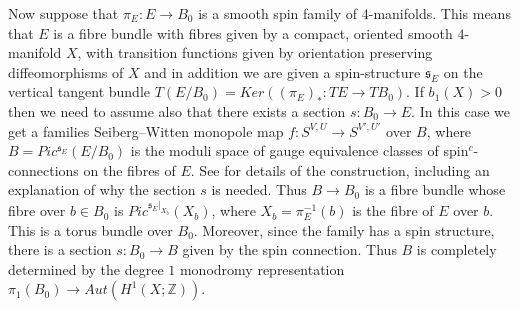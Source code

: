 \documentclass{amsart}
\theoremstyle{definition}
\theoremstyle{remark}
\numberwithin{equation}{section}
\begin{document}
Now suppose that $\pi_E : E \to B_0$ is a smooth spin family of $4$-manifolds. This means that $E$ is a fibre bundle with fibres given by a compact, oriented smooth $4$-manifold $X$, with transition functions given by orientation preserving diffeomorphisms of $X$ and in addition we are given a spin-structure $\mathfrak{s}_E$ on the vertical tangent bundle $T(E/B_0) = Ker( (\pi_E)_* : TE \to TB_0 )$. If $b_1(X) > 0$ then we need to assume also that there exists a section $s : B_0 \to E$. In this case we get a families Seiberg--Witten monopole map $f : S^{V,U} \to S^{V',U'}$ over $B$, where $B = Pic^{\mathfrak{s}_E}(E/B_0)$ is the moduli space of gauge equivalence classes of spin$^c$-connections on the fibres of $E$. See \cite[Example 2.4]{bk} for details of the construction, including an explanation of why the section $s$ is needed. Thus $B \to B_0$ is a fibre bundle whose fibre over $b \in B_0$ is $Pic^{\mathfrak{s}_E|_{X_b}}(X_b)$, where $X_b = \pi_E^{-1}(b)$ is the fibre of $E$ over $b$. This is a torus bundle over $B_0$. Moreover, since the family has a spin structure, there is a section $s : B_0 \to B$ given by the spin connection. Thus $B$ is completely determined by the degree $1$ monodromy representation $\pi_1(B_0) \to Aut( H^1(X ; \mathbb{Z}) )$.
\end{document}
